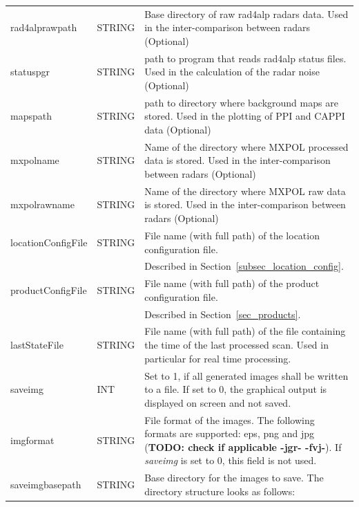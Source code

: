 \documentclass[a4paper,11pt,pdftex,twoside]{scrartcl}
\renewcommand{\bf}{\normalfont \bfseries}
\begin{document}
{{{\begin{longtable}{p{}p{}p{}}
rad4alprawpath     & STRING    & Base directory of raw rad4alp radars data. Used in the inter-comparison
                                 between radars (Optional)\\
statuspgr          & STRING    & path to program that reads rad4alp status files. Used in the
                                 calculation of the radar noise (Optional)\\
mapspath           & STRING    & path to directory where background maps are stored. Used in the
                                 plotting of PPI and CAPPI data (Optional)\\
mxpolname          & STRING    & Name of the directory where MXPOL processed data is stored. Used in
                                 the inter-comparison between radars (Optional)\\
mxpolrawname       & STRING    & Name of the directory where MXPOL raw data is stored. Used in the
                                 inter-comparison between radars (Optional)\\
locationConfigFile & STRING    & File name (with full path) of the location configuration file.\\
                   &           & Described in Section~\ref{subsec_location_config}.\\
productConfigFile  & STRING    & File name (with full path) of the product configuration file.\\
                   &           & Described in Section~\ref{sec_products}.\\
lastStateFile      & STRING    & File name (with full path) of the file containing the time
                                 of the last processed scan. Used in particular for real time
                                  processing.\\
saveimg            & INT       & Set to 1, if all generated images shall be written to a file.
                                 If set to 0, the graphical output is displayed on screen and
                                 not saved.\\
imgformat          & STRING    & File format of the images. The following formats are supported:
                                 eps, png and jpg ({\bf TODO: check if applicable -jgr- -fvj-}). If \emph{saveimg} is set to 0, this field is
                                 not used.\\
saveimgbasepath    & STRING    & Base directory for the images to save. The directory structure
                                 looks as follows:

\end{longtable}}}}
\end{document}
